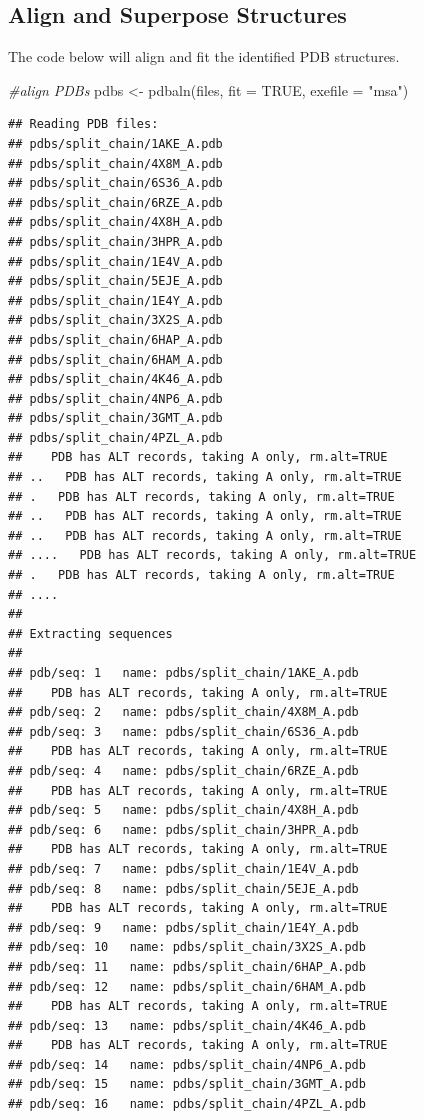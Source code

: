 \documentclass[
]{article}
\newenvironment{Shaded}{\begin{snugshade}}{\end{snugshade}}
\newcommand{\AttributeTok}[1]{\textcolor[rgb]{0.77,0.63,0.00}{#1}}
\newcommand{\CommentTok}[1]{\textcolor[rgb]{0.56,0.35,0.01}{\textit{#1}}}
\newcommand{\ConstantTok}[1]{\textcolor[rgb]{0.00,0.00,0.00}{#1}}
\newcommand{\FunctionTok}[1]{\textcolor[rgb]{0.00,0.00,0.00}{#1}}
\newcommand{\NormalTok}[1]{#1}
\newcommand{\OtherTok}[1]{\textcolor[rgb]{0.56,0.35,0.01}{#1}}
\newcommand{\StringTok}[1]{\textcolor[rgb]{0.31,0.60,0.02}{#1}}
\begin{document}
\hypertarget{align-and-superpose-structures}{%
\subsection{Align and Superpose
Structures}\label{align-and-superpose-structures}}

The code below will align and fit the identified PDB structures.

\begin{Shaded}
\begin{Highlighting}[]
\CommentTok{\#align PDBs}
\NormalTok{pdbs }\OtherTok{\textless{}{-}} \FunctionTok{pdbaln}\NormalTok{(files, }\AttributeTok{fit =} \ConstantTok{TRUE}\NormalTok{, }\AttributeTok{exefile =} \StringTok{"msa"}\NormalTok{)}
\end{Highlighting}
\end{Shaded}

\begin{verbatim}
## Reading PDB files:
## pdbs/split_chain/1AKE_A.pdb
## pdbs/split_chain/4X8M_A.pdb
## pdbs/split_chain/6S36_A.pdb
## pdbs/split_chain/6RZE_A.pdb
## pdbs/split_chain/4X8H_A.pdb
## pdbs/split_chain/3HPR_A.pdb
## pdbs/split_chain/1E4V_A.pdb
## pdbs/split_chain/5EJE_A.pdb
## pdbs/split_chain/1E4Y_A.pdb
## pdbs/split_chain/3X2S_A.pdb
## pdbs/split_chain/6HAP_A.pdb
## pdbs/split_chain/6HAM_A.pdb
## pdbs/split_chain/4K46_A.pdb
## pdbs/split_chain/4NP6_A.pdb
## pdbs/split_chain/3GMT_A.pdb
## pdbs/split_chain/4PZL_A.pdb
##    PDB has ALT records, taking A only, rm.alt=TRUE
## ..   PDB has ALT records, taking A only, rm.alt=TRUE
## .   PDB has ALT records, taking A only, rm.alt=TRUE
## ..   PDB has ALT records, taking A only, rm.alt=TRUE
## ..   PDB has ALT records, taking A only, rm.alt=TRUE
## ....   PDB has ALT records, taking A only, rm.alt=TRUE
## .   PDB has ALT records, taking A only, rm.alt=TRUE
## ....
## 
## Extracting sequences
## 
## pdb/seq: 1   name: pdbs/split_chain/1AKE_A.pdb 
##    PDB has ALT records, taking A only, rm.alt=TRUE
## pdb/seq: 2   name: pdbs/split_chain/4X8M_A.pdb 
## pdb/seq: 3   name: pdbs/split_chain/6S36_A.pdb 
##    PDB has ALT records, taking A only, rm.alt=TRUE
## pdb/seq: 4   name: pdbs/split_chain/6RZE_A.pdb 
##    PDB has ALT records, taking A only, rm.alt=TRUE
## pdb/seq: 5   name: pdbs/split_chain/4X8H_A.pdb 
## pdb/seq: 6   name: pdbs/split_chain/3HPR_A.pdb 
##    PDB has ALT records, taking A only, rm.alt=TRUE
## pdb/seq: 7   name: pdbs/split_chain/1E4V_A.pdb 
## pdb/seq: 8   name: pdbs/split_chain/5EJE_A.pdb 
##    PDB has ALT records, taking A only, rm.alt=TRUE
## pdb/seq: 9   name: pdbs/split_chain/1E4Y_A.pdb 
## pdb/seq: 10   name: pdbs/split_chain/3X2S_A.pdb 
## pdb/seq: 11   name: pdbs/split_chain/6HAP_A.pdb 
## pdb/seq: 12   name: pdbs/split_chain/6HAM_A.pdb 
##    PDB has ALT records, taking A only, rm.alt=TRUE
## pdb/seq: 13   name: pdbs/split_chain/4K46_A.pdb 
##    PDB has ALT records, taking A only, rm.alt=TRUE
## pdb/seq: 14   name: pdbs/split_chain/4NP6_A.pdb 
## pdb/seq: 15   name: pdbs/split_chain/3GMT_A.pdb 
## pdb/seq: 16   name: pdbs/split_chain/4PZL_A.pdb
\end{verbatim}
\end{document}

